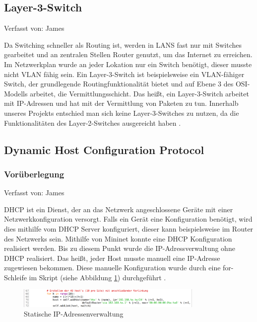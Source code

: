 \documentclass[fontsize=12pt,paper=a4,open=any,parskip=half,
  twoside=false,toc=listof,toc=bibliography,fleqn,leqno,
  captions=nooneline,captions=tableabove,british]{scrbook}
\begin{document}
\subsection{Layer-3-Switch}
{\tiny Verfasst von: James\par}
Da Switching schneller als Routing ist, werden in LANS fast nur mit Switches gearbeitet und an zentralen Stellen Router genutzt, um das Internet zu erreichen. Im Netzwerkplan wurde an jeder Lokation nur ein Switch benötigt, dieser musste nicht VLAN fähig sein. Ein Layer-3-Switch ist beispielsweise ein VLAN-fähiger Switch, der grundlegende Routingfunktionalität bietet und auf Ebene 3 des OSI-Modells arbeitet, die Vermittlungsschicht. Das heißt, ein Layer-3-Switch arbeitet mit IP-Adressen und hat mit der Vermittlung von Paketen zu tun. Innerhalb unseres Projekts entschied man sich keine Layer-3-Switches zu nutzen, da die Funktionalitäten des Layer-2-Switches ausgereicht haben \cite{baun2019grundlagen}.

\newpage
\subsection{Dynamic Host Configuration Protocol}
\subsubsection{Vorüberlegung}
{\tiny Verfasst von: James\par}
DHCP ist ein Dienst, der an das Netzwerk angeschlossene Geräte mit einer Netzwerkkonfiguration versorgt. Falls ein Gerät eine Konfiguration benötigt, wird dies mithilfe vom DHCP Server konfiguriert, dieser kann beispielsweise im Router des Netzwerks sein. Mithilfe von Mininet konnte eine DHCP Konfiguration realisiert werden. Bis zu diesem Punkt wurde die IP-Adressverwaltung ohne DHCP realisiert. Das heißt, jeder Host musste manuell eine IP-Adresse zugewiesen bekommen. Diese manuelle Konfiguration wurde durch eine for-Schleife im Skript (siehe Abbildung \ref{fororig}) durchgeführt \cite{baun2019grundlagen}.

\begin{figure}[H]
 \centering
 \includegraphics[width=0.8\textwidth]{Bilder/fororig}
 \captionsetup{justification=centering}
 \caption{Statische IP-Adressenverwaltung}
 \label{fororig}
\end{figure}
\end{document}
